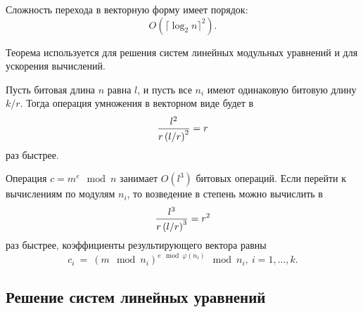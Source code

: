 Сложность перехода в векторную форму имеет порядок:
        \[ O( \lceil \log_2 n \rceil ^2). \]

Теорема используется для решения систем линейных модульных уравнений и для ускорения вычислений.

Пусть битовая длина $n$ равна $l$, и пусть все $n_i$ имеют одинаковую битовую длину $k / r$. Тогда операция умножения в векторном виде будет в
    \[ \frac{l^2}{r \left( l \middle/ r \right)^2 } = r \]
раз быстрее.

Операция $c = m^e \mod n$ занимает $O(l^3)$ битовых операций. Если перейти к вычислениям по модулям $n_i$, то возведение в степень можно вычислить в
    \[ \frac{l^3}{r \left( l \middle/ r \right)^3 } = r^2 \]
раз быстрее, коэффициенты результирующего вектора равны
    \[ c_i ~=~ \left( m \mod n_i \right)^{e \mod \varphi(n_i)} \mod n_i, ~ i = 1, \dots, k. \]

\subsection{Решение систем линейных уравнений}

